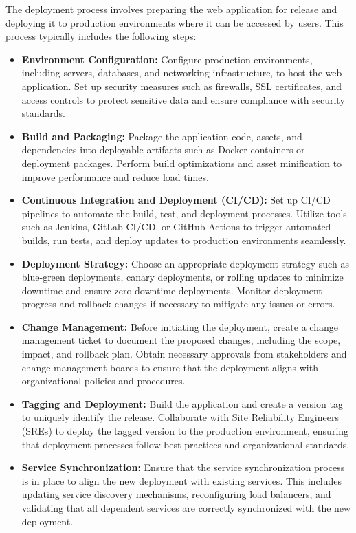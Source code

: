 \documentclass[12pt,a4paper]{report}
\begin{document}
The deployment process involves preparing the web application for release and deploying it to production environments where it can be accessed by users. This process typically includes the following steps:

\begin{itemize}
    \item \textbf{Environment Configuration:} Configure production environments, including servers, databases, and networking infrastructure, to host the web application. Set up security measures such as firewalls, SSL certificates, and access controls to protect sensitive data and ensure compliance with security standards.
    
    \item \textbf{Build and Packaging:} Package the application code, assets, and dependencies into deployable artifacts such as Docker containers or deployment packages. Perform build optimizations and asset minification to improve performance and reduce load times.
    
    \item \textbf{Continuous Integration and Deployment (CI/CD):} Set up CI/CD pipelines to automate the build, test, and deployment processes. Utilize tools such as Jenkins, GitLab CI/CD, or GitHub Actions to trigger automated builds, run tests, and deploy updates to production environments seamlessly.
    
    \item \textbf{Deployment Strategy:} Choose an appropriate deployment strategy such as blue-green deployments, canary deployments, or rolling updates to minimize downtime and ensure zero-downtime deployments. Monitor deployment progress and rollback changes if necessary to mitigate any issues or errors.

    \item \textbf{Change Management:} Before initiating the deployment, create a change management ticket to document the proposed changes, including the scope, impact, and rollback plan. Obtain necessary approvals from stakeholders and change management boards to ensure that the deployment aligns with organizational policies and procedures.

    \item \textbf{Tagging and Deployment:} Build the application and create a version tag to uniquely identify the release. Collaborate with Site Reliability Engineers (SREs) to deploy the tagged version to the production environment, ensuring that deployment processes follow best practices and organizational standards.

    \item \textbf{Service Synchronization:} Ensure that the service synchronization process is in place to align the new deployment with existing services. This includes updating service discovery mechanisms, reconfiguring load balancers, and validating that all dependent services are correctly synchronized with the new deployment.

\end{itemize}
\end{document}
